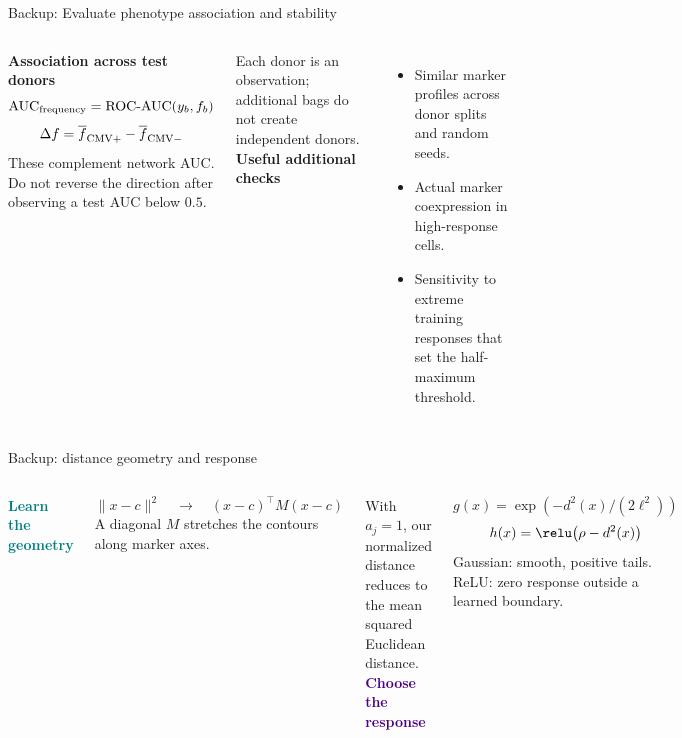 \begin{frame}{Backup: Evaluate phenotype association and stability}

\begin{columns}[T,onlytextwidth]
\textbf{Association across test donors}
\[\mathrm{AUC}_{\rm frequency}=\mathrm{ROC\text{-}AUC}(y_b,f_b)\]
\[\Delta f=\overline f_{\rm CMV+}-\overline f_{\rm CMV-}\]
\small These complement network AUC. Do not reverse the direction after observing a test AUC below $0.5$.\par
\vspace{2mm}
Each donor is an observation; additional bags do not create independent donors.
\textbf{Useful additional checks}
\begin{itemize}
\item Similar marker profiles across donor splits and random seeds.
\item Actual marker coexpression in high-response cells.
\item Sensitivity to extreme training responses that set the half-maximum threshold.
\end{itemize}
\end{columns}

\end{frame}
\begin{frame}{Backup: distance geometry and response}

\begin{columns}[T,onlytextwidth]
\textcolor{Teal}{\textbf{Learn the geometry}}\par
\[\|x-c\|^2\quad\longrightarrow\quad (x-c)^\top M(x-c)\]
A diagonal $M$ stretches the contours along marker axes.\par
\vspace{3mm}
With $a_j=1$, our normalized distance reduces to the mean squared Euclidean distance.
\textcolor{Indigo}{\textbf{Choose the response}}\par
\[g(x)=\exp\!\left(-d^2(x)/(2\ell^2)\right)\]
\[h(x)=\relu\!\left(\rho-d^2(x)\right)\]
Gaussian: smooth, positive tails.\\
ReLU: zero response outside a learned boundary.
\end{columns}

\end{frame}

